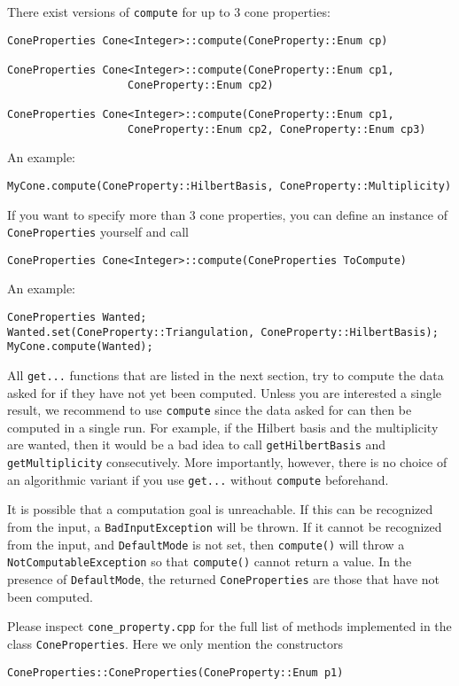 \begin{small}
There exist versions of \verb|compute| for up to $3$ cone properties:
\begin{Verbatim}
ConeProperties Cone<Integer>::compute(ConeProperty::Enum cp)

ConeProperties Cone<Integer>::compute(ConeProperty::Enum cp1, 
                   ConeProperty::Enum cp2)

ConeProperties Cone<Integer>::compute(ConeProperty::Enum cp1, 
                   ConeProperty::Enum cp2, ConeProperty::Enum cp3)
\end{Verbatim}

An example:
\begin{Verbatim}
MyCone.compute(ConeProperty::HilbertBasis, ConeProperty::Multiplicity)
\end{Verbatim}

If you want to specify more than $3$ cone properties, you can define an instance of \verb|ConeProperties| yourself and call
\begin{Verbatim}
ConeProperties Cone<Integer>::compute(ConeProperties ToCompute)
\end{Verbatim}

An example:
\begin{Verbatim}
ConeProperties Wanted;
Wanted.set(ConeProperty::Triangulation, ConeProperty::HilbertBasis);
MyCone.compute(Wanted);
\end{Verbatim}

All \verb|get...| functions that are listed in the next section, try to compute the data asked for if they have not yet been computed. Unless you are interested a single result, we recommend to use \verb|compute| since the data asked for can then be computed in a single run. For example, if the Hilbert basis and the multiplicity are wanted, then it would be a bad idea to call \verb|getHilbertBasis| and \verb|getMultiplicity| consecutively. More importantly, however, there is no choice of an algorithmic variant if you use \verb|get...| without \verb|compute| beforehand.

It is possible that a computation goal is unreachable. If this can be recognized from the input, a \verb|BadInputException| will be thrown. If it cannot be recognized from the input, and \verb|DefaultMode| is not set, then \verb|compute()| will throw a \verb|NotComputableException| so that \verb|compute()| cannot return a value. In the presence of \verb|DefaultMode|, the returned \verb|ConeProperties| are those that have not been computed.

Please inspect \verb|cone_property.cpp| for the full list of methods implemented in the class \verb|ConeProperties|. Here we only mention the constructors
\begin{Verbatim}
ConeProperties::ConeProperties(ConeProperty::Enum p1)


\end{Verbatim}
\end{small}
